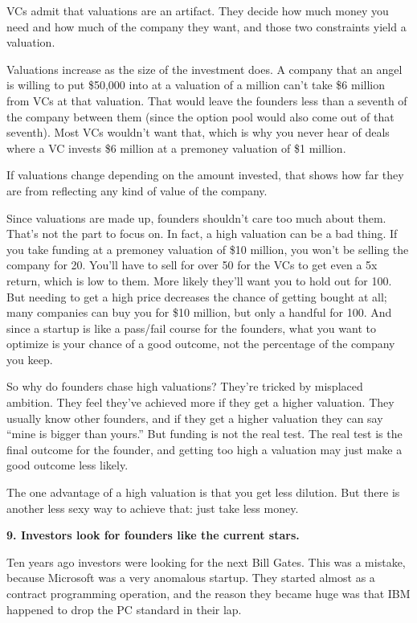 VCs admit that valuations are an artifact. They decide how much money
you need and how much of the company they want, and those two
constraints yield a valuation.

Valuations increase as the size of the investment does. A company that
an angel is willing to put \$50,000 into at a valuation of a million
can't take \$6 million from VCs at that valuation. That would leave the
founders less than a seventh of the company between them (since the
option pool would also come out of that seventh). Most VCs wouldn't want
that, which is why you never hear of deals where a VC invests \$6
million at a premoney valuation of \$1 million.

If valuations change depending on the amount invested, that shows how
far they are from reflecting any kind of value of the company.

Since valuations are made up, founders shouldn't care too much about
them. That's not the part to focus on. In fact, a high valuation can be
a bad thing. If you take funding at a premoney valuation of \$10
million, you won't be selling the company for 20. You'll have to sell
for over 50 for the VCs to get even a 5x return, which is low to them.
More likely they'll want you to hold out for 100. But needing to get a
high price decreases the chance of getting bought at all; many companies
can buy you for \$10 million, but only a handful for 100. And since a
startup is like a pass/fail course for the founders, what you want to
optimize is your chance of a good outcome, not the percentage of the
company you keep.

So why do founders chase high valuations? They're tricked by misplaced
ambition. They feel they've achieved more if they get a higher
valuation. They usually know other founders, and if they get a higher
valuation they can say ``mine is bigger than yours.'' But funding is not
the real test. The real test is the final outcome for the founder, and
getting too high a valuation may just make a good outcome less likely.

The one advantage of a high valuation is that you get less dilution. But
there is another less sexy way to achieve that: just take less money.

\textbf{9. Investors look for founders like the current stars.}

Ten years ago investors were looking for the next Bill Gates. This was a
mistake, because Microsoft was a very anomalous startup. They started
almost as a contract programming operation, and the reason they became
huge was that IBM happened to drop the PC standard in their lap.

